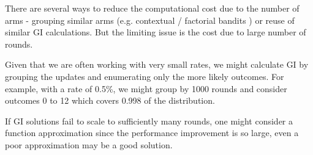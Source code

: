 \documentclass[11pt,a4,singlespacing,titlepagenumber=on]{scrreprt}
\numberwithin{equation}{chapter} %
\theoremstyle{remark}
\begin{document}
There are several ways to reduce the computational cost due to the number of arms - grouping similar arms (e.g. contextual / factorial bandits ) or reuse of similar GI calculations. But the limiting issue is the cost due to large number of rounds.

Given that we are often working with very small rates, we might calculate GI by grouping the updates and enumerating only the more likely outcomes. For example, with a rate of 0.5\%, we might group by 1000 rounds and consider outcomes 0 to 12 which covers 0.998 of the distribution. 

If GI solutions fail to scale to sufficiently many rounds, one might consider a function approximation since the performance improvement is so large, even a poor approximation may be a good solution.














\cleardoublepage
{}




{}


\appendix %
\end{document}
